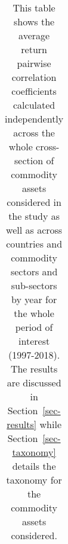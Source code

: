 \documentclass[
  authoryear,
  preprint,
  3p]{elsarticle}
\begin{document}
\begin{landscape}\begingroup\fontsize{7}{9}\selectfont

\begin{longtable}[t]{>{}l>{}l>{}l>{}l>{}r>{}r>{}r>{}r>{}r>{}r>{}r>{}r>{}r>{}r}

\caption{\label{tbl-correlations-years}This table shows the average
return pairwise correlation coefficients calculated independently across
the whole cross-section of commodity assets considered in the study as
well as across countries and commodity sectors and sub-sectors by year
for the whole period of interest (1997-2018). The results are discussed
in Section~\ref{sec-results} while Section~\ref{sec-taxonomy} details
the taxonomy for the commodity assets considered.}

\tabularnewline


\end{longtable}
\end{landscape}
\end{document}
